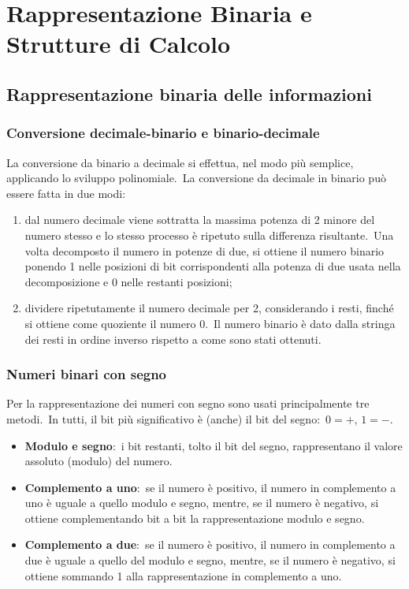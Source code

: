 \chapter{Rappresentazione Binaria e Strutture di Calcolo}

\section{Rappresentazione binaria delle informazioni}

\subsection{Conversione decimale-binario e binario-decimale}

La conversione da binario a decimale si effettua, nel modo più semplice, applicando lo sviluppo
polinomiale.\
La conversione da decimale in binario può essere fatta in due modi:

\begin{enumerate}
    \item dal numero decimale viene sottratta la massima potenza di 2 minore del numero stesso e lo stesso processo è ripetuto sulla differenza risultante.\ Una volta decomposto il numero in potenze di due, si ottiene il numero binario ponendo 1 nelle posizioni di bit corrispondenti alla potenza di due usata nella decomposizione e 0 nelle restanti posizioni;
    \item dividere ripetutamente il numero decimale per 2, considerando i resti, finché si ottiene come quoziente il numero 0.\ Il numero binario è dato dalla stringa dei resti in ordine inverso rispetto a come sono stati ottenuti.
\end{enumerate}

\subsection{Numeri binari con segno}

Per la rappresentazione dei numeri con segno sono usati principalmente tre metodi.\
In tutti, il bit più significativo è (anche) il bit del segno:\ $0 = +$, $1 = -$.

\begin{itemize}
    \item \textbf{Modulo e segno}:\ i bit restanti, tolto il bit del segno, rappresentano il valore assoluto (modulo) del numero.
    \item \textbf{Complemento a uno}:\ se il numero è positivo, il numero in complemento a uno è uguale a quello modulo e segno, mentre, se il numero è negativo, si ottiene complementando bit a bit la rappresentazione modulo e segno.
    \item \textbf{Complemento a due}:\ se il numero è positivo, il numero in complemento a due è uguale a quello del modulo e segno, mentre, se il numero è negativo, si ottiene sommando 1 alla rappresentazione in complemento a uno.
\end{itemize}

